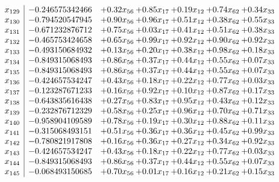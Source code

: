 \documentclass[8pt]{article}
\begin{document}
\[\begin{array}{c| c c@{\hskip 2pt} c@{\hskip 2pt} c@{\hskip 2pt} c@{\hskip 2pt} c@{\hskip 2pt} }
 x_{129}   &  -0.246575342466 & +  0.32 x_{56} & +  0.85 x_{17} & +  0.19 x_{12} & +  0.74 x_{62} & +  0.34 x_{33}\\
 x_{130}   &  -0.794520547945 & +  0.90 x_{56} & +  0.96 x_{17} & +  0.51 x_{12} & +  0.38 x_{62} & +  0.55 x_{33}\\
 x_{131}   &  -0.671232876712 & +  0.75 x_{56} & +  0.03 x_{17} & +  0.41 x_{12} & +  0.51 x_{62} & +  0.38 x_{33}\\
 x_{132}   &  -0.465753424658 & +  0.65 x_{56} & +  0.99 x_{17} & +  0.92 x_{12} & +  0.90 x_{62} & +  0.92 x_{33}\\
 x_{133}   &  -0.493150684932 & +  0.13 x_{56} & +  0.20 x_{17} & +  0.38 x_{12} & +  0.98 x_{62} & +  0.18 x_{33}\\
 x_{134}   &  -0.849315068493 & +  0.86 x_{56} & +  0.37 x_{17} & +  0.44 x_{12} & +  0.55 x_{62} & +  0.07 x_{33}\\
 x_{135}   &  -0.849315068493 & +  0.86 x_{56} & +  0.37 x_{17} & +  0.44 x_{12} & +  0.55 x_{62} & +  0.07 x_{33}\\
 x_{136}   &  -0.424657534247 & +  0.43 x_{56} & +  0.18 x_{17} & +  0.22 x_{12} & +  0.77 x_{62} & +  0.03 x_{33}\\
 x_{137}   &  -0.123287671233 & +  0.16 x_{56} & +  0.92 x_{17} & +  0.10 x_{12} & +  0.87 x_{62} & +  0.17 x_{33}\\
 x_{138}   &  -0.643835616438 & +  0.27 x_{56} & +  0.83 x_{17} & +  0.95 x_{12} & +  0.43 x_{62} & +  0.12 x_{33}\\
 x_{139}   &  -0.232876712329 & +  0.58 x_{56} & +  0.25 x_{17} & +  0.96 x_{12} & +  0.70 x_{62} & +  0.71 x_{33}\\
 x_{140}   &  -0.958904109589 & +  0.78 x_{56} & +  0.19 x_{17} & +  0.30 x_{12} & +  0.88 x_{62} & +  0.11 x_{33}\\
 x_{141}   &  -0.315068493151 & +  0.51 x_{56} & +  0.36 x_{17} & +  0.36 x_{12} & +  0.45 x_{62} & +  0.99 x_{33}\\
 x_{142}   &  -0.780821917808 & +  0.16 x_{56} & +  0.36 x_{17} & +  0.27 x_{12} & +  0.34 x_{62} & +  0.92 x_{33}\\
 x_{143}   &  -0.424657534247 & +  0.43 x_{56} & +  0.18 x_{17} & +  0.22 x_{12} & +  0.77 x_{62} & +  0.03 x_{33}\\
 x_{144}   &  -0.849315068493 & +  0.86 x_{56} & +  0.37 x_{17} & +  0.44 x_{12} & +  0.55 x_{62} & +  0.07 x_{33}\\
 x_{145}   &  -0.068493150685 & +  0.70 x_{56} & +  0.01 x_{17} & +  0.16 x_{12} & +  0.21 x_{62} & +  0.15 x_{33}\\

\end{array}\]
\end{document}
